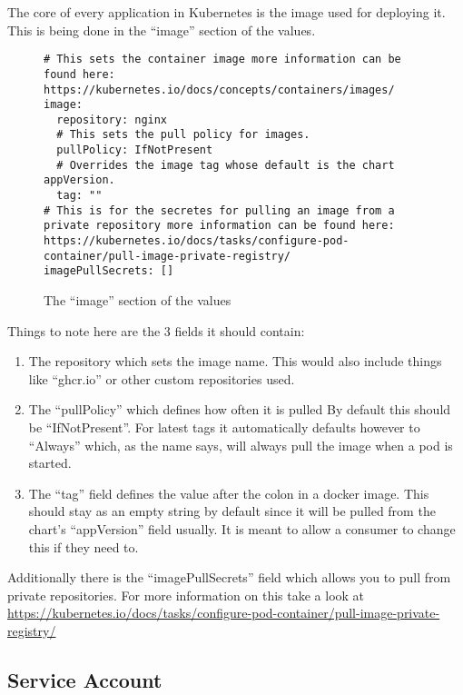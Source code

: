 The core of every application in Kubernetes is the image used for deploying it.
This is being done in the \enquote{image} section of the  \gls{values}.

\begin{figure}[h]
\begin{verbatim}
# This sets the container image more information can be found here: https://kubernetes.io/docs/concepts/containers/images/
image:
  repository: nginx
  # This sets the pull policy for images.
  pullPolicy: IfNotPresent
  # Overrides the image tag whose default is the chart appVersion.
  tag: ""
# This is for the secretes for pulling an image from a private repository more information can be found here: https://kubernetes.io/docs/tasks/configure-pod-container/pull-image-private-registry/
imagePullSecrets: []
\end{verbatim}
\caption{The \enquote{image} section of the \gls{values}}\label{code:image_section}
\end{figure}

Things to note here are the 3 fields it should contain:

\begin{enumerate}
	\item{
		The repository which sets the image name.
		This would also include things like \enquote{ghcr.io} or other custom repositories used.
	}
	\item{
		The \enquote{pullPolicy} which defines how often it is pulled
		By default this should be \enquote{IfNotPresent}.
		For latest tags it automatically defaults however to \enquote{Always} which, as the name says, will always pull the image when a pod is started.
	}
	\item{
		The \enquote{tag} field defines the value after the colon in a docker image.
		This should stay as an empty string by default since it will be pulled from the chart's \enquote{appVersion} field usually.
		It is meant to allow a consumer to change this if they need to.
	}
\end{enumerate}

Additionally there is the \enquote{imagePullSecrets} field which allows you to pull from private repositories. For more information on this take a look at \url{https://kubernetes.io/docs/tasks/configure-pod-container/pull-image-private-registry/}
\clearpage

\subsection{Service Account}

